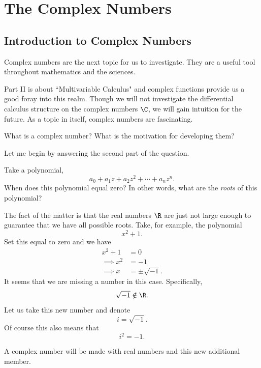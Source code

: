 
    \chapter{The Complex Numbers}
        
        \section{Introduction to Complex Numbers}
        
        Complex numbers are the next topic for us to investigate.  They are a useful tool throughout mathematics and the sciences. 
        
        Part II is about ``Multivariable Calculus" and complex functions provide us a good foray into this realm.  Though we will not investigate the differential calculus structure on the complex numbers $\C$, we will gain intuition for the future.  As a topic in itself, complex numbers are fascinating.
        
        \begin{question}
        What is a complex number? What is the motivation for developing them?
        \end{question}
        
        \begin{answer}
        Let me begin by answering the second part of the question.  
        
        Take a polynomial,
        \[
        a_0+a_1 z + a_2 z^2 + \cdots + a_n z^n.
        \]
        When does this polynomial equal zero?  In other words, what are the \emph{roots} of this polynomial?
        
        The fact of the matter is that the real numbers $\R$ are just not large enough to guarantee that we have all possible roots. Take, for example, the polynomial
        \[
        x^2+1.
        \]
        Set this equal to zero and we have
        \begin{align*}
            x^2+1&=0\\
            \implies x^2&=-1\\
            \implies x&=\pm \sqrt{-1}.
        \end{align*}
        It seems that we are missing a number in this case.  Specifically, 
        \[
        \sqrt{-1}\notin \R.
        \]
        Let us take this new number and denote
        \[
        i=\sqrt{-1}.
        \]
        Of course this also means that
        \[
        i^2=-1.
        \]
        
        A complex number will be made with real numbers and this new additional member. 
        \end{answer}
        
